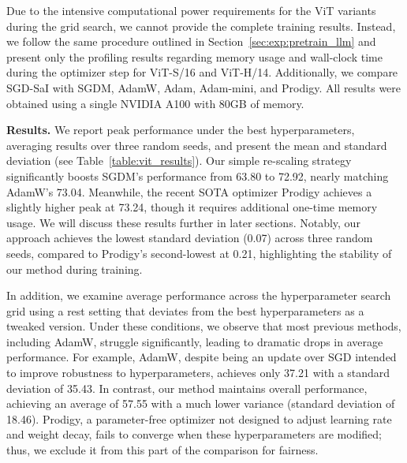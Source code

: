 Due to the intensive computational power requirements for the ViT variants during the grid search, we cannot provide the complete training results. Instead, we follow the same procedure outlined in Section~\ref{sec:exp:pretrain_llm} and present only the profiling results regarding memory usage and wall-clock time during the optimizer step for ViT-S/16 and ViT-H/14. Additionally, we compare SGD-SaI with SGDM, AdamW, Adam, Adam-mini, and Prodigy.
All results were obtained using a single NVIDIA A100 with 80GB of memory.


\textbf{Results.} 
We report peak performance under the best hyperparameters, averaging results over three random seeds, and present the mean and standard deviation (see Table~\ref{table:vit_results}). Our simple re-scaling strategy significantly boosts SGDM's performance from 63.80 to 72.92, nearly matching AdamW's 73.04. Meanwhile, the recent SOTA optimizer Prodigy achieves a slightly higher peak at 73.24, though it requires additional one-time memory usage. We will discuss these results further in later sections. Notably, our approach achieves the lowest standard deviation (0.07) across three random seeds, compared to Prodigy’s second-lowest at 0.21, highlighting the stability of our method during training.

In addition, we examine average performance across the hyperparameter search grid using a rest setting that deviates from the best hyperparameters as a tweaked version. Under these conditions, we observe that most previous methods, including AdamW, struggle significantly, leading to dramatic drops in average performance. For example, AdamW, despite being an update over SGD intended to improve robustness to hyperparameters, achieves only 37.21 with a standard deviation of 35.43. In contrast, our method maintains overall performance, achieving an average of 57.55 with a much lower variance (standard deviation of 18.46). Prodigy, a parameter-free optimizer not designed to adjust learning rate and weight decay, fails to converge when these hyperparameters are modified; thus, we exclude it from this part of the comparison for fairness.

